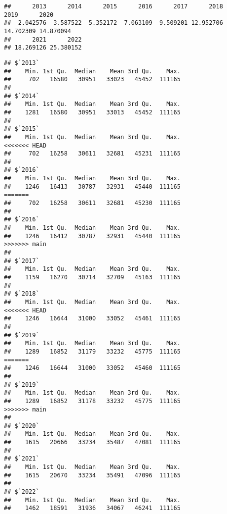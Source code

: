\documentclass[
]{article}
\newenvironment{Shaded}{\begin{snugshade}}{\end{snugshade}}
\newcommand{\AttributeTok}[1]{\textcolor[rgb]{0.13,0.29,0.53}{#1}}
\newcommand{\ConstantTok}[1]{\textcolor[rgb]{0.56,0.35,0.01}{#1}}
\newcommand{\FunctionTok}[1]{\textcolor[rgb]{0.13,0.29,0.53}{\textbf{#1}}}
\newcommand{\NormalTok}[1]{#1}
\newcommand{\SpecialCharTok}[1]{\textcolor[rgb]{0.81,0.36,0.00}{\textbf{#1}}}
\begin{document}
\begin{Shaded}
\end{Shaded}

\begin{verbatim}
##      2013      2014      2015      2016      2017      2018      2019      2020 
##  2.042576  3.587522  5.352172  7.063109  9.509201 12.952706 14.702309 14.870094 
##      2021      2022 
## 18.269126 25.380152
\end{verbatim}

\begin{Shaded}
\end{Shaded}

\begin{verbatim}
## $`2013`
##    Min. 1st Qu.  Median    Mean 3rd Qu.    Max. 
##     702   16580   30951   33023   45452  111165 
## 
## $`2014`
##    Min. 1st Qu.  Median    Mean 3rd Qu.    Max. 
##    1281   16580   30951   33013   45452  111165 
## 
## $`2015`
##    Min. 1st Qu.  Median    Mean 3rd Qu.    Max. 
<<<<<<< HEAD
##     702   16258   30611   32681   45231  111165 
## 
## $`2016`
##    Min. 1st Qu.  Median    Mean 3rd Qu.    Max. 
##    1246   16413   30787   32931   45440  111165 
=======
##     702   16258   30611   32681   45230  111165 
## 
## $`2016`
##    Min. 1st Qu.  Median    Mean 3rd Qu.    Max. 
##    1246   16412   30787   32931   45440  111165 
>>>>>>> main
## 
## $`2017`
##    Min. 1st Qu.  Median    Mean 3rd Qu.    Max. 
##    1159   16270   30714   32709   45163  111165 
## 
## $`2018`
##    Min. 1st Qu.  Median    Mean 3rd Qu.    Max. 
<<<<<<< HEAD
##    1246   16644   31000   33052   45461  111165 
## 
## $`2019`
##    Min. 1st Qu.  Median    Mean 3rd Qu.    Max. 
##    1289   16852   31179   33232   45775  111165 
=======
##    1246   16644   31000   33052   45460  111165 
## 
## $`2019`
##    Min. 1st Qu.  Median    Mean 3rd Qu.    Max. 
##    1289   16852   31178   33232   45775  111165 
>>>>>>> main
## 
## $`2020`
##    Min. 1st Qu.  Median    Mean 3rd Qu.    Max. 
##    1615   20666   33234   35487   47081  111165 
## 
## $`2021`
##    Min. 1st Qu.  Median    Mean 3rd Qu.    Max. 
##    1615   20670   33234   35491   47096  111165 
## 
## $`2022`
##    Min. 1st Qu.  Median    Mean 3rd Qu.    Max. 
##    1462   18591   31936   34067   46241  111165
\end{verbatim}
\end{document}
